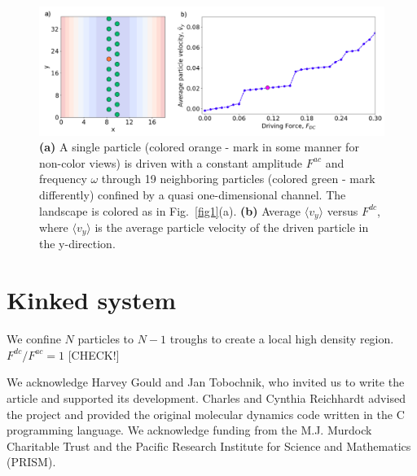 \documentclass[twocolumn,preprintnumbers,amsmath,amssymb,aps,prx]{revtex4}
\begin{document}
\begin{center}
\begin{figure}[h!]
\centering
\includegraphics[width=\columnwidth]{twenty}
\caption{\textbf{(a)} A single particle (colored orange - mark in some manner for non-color views) is driven with a constant amplitude $F^{ac}$ and frequency $\omega$ through 19 neighboring particles (colored green - mark differently) confined by a quasi one-dimensional channel. The landscape is colored as in Fig.~\ref{fig1}(a). \textbf{(b)} Average $\langle {v}_{y} \rangle $ versus $F^{dc}$, where $\langle {v}_{y} \rangle$ is the average particle velocity of the driven particle in the y-direction.}
\label{fig:2}
\end{figure}
\end{center}

\section{Kinked system}
\label{sec:kink}	%
We confine $N$ particles to $N-1$ troughs to create a
local high density region.
$F^{dc}/F^{ac} = 1$ [CHECK!]





\begin{acknowledgments}

  We acknowledge Harvey Gould and Jan Tobochnik,
  who invited us to write the article and
  supported its development.
  Charles and Cynthia Reichhardt advised 
  the project and provided the original molecular dynamics code
  written in the C programming language.
  We acknowledge funding from the M.J. Murdock Charitable Trust
  and the Pacific Research Institute for Science and Mathematics (PRISM).

\end{acknowledgments}
\end{document}
